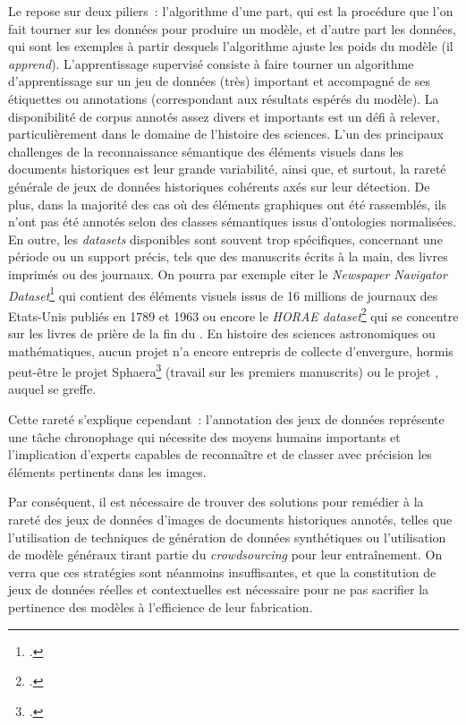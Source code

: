 
Le \ml repose sur deux piliers~: l'algorithme d'une part,
qui est la procédure que l'on fait tourner sur les données pour produire
un modèle, et d'autre part les données, qui sont les exemples à partir
desquels l'algorithme ajuste les poids du modèle (il \emph{apprend}).
L'apprentissage supervisé consiste à faire tourner un algorithme d'apprentissage
sur un jeu de données (très) important et accompagné de ses étiquettes
ou annotations (correspondant aux résultats espérés du modèle). La
disponibilité de corpus annotés assez divers et importants est un défi à
relever, particulièrement dans le domaine de l'histoire des sciences.
L'un des principaux challenges de la reconnaissance sémantique des
éléments visuels dans les documents historiques est leur grande
variabilité, ainsi que, et surtout, la rareté générale de jeux de
données historiques cohérents axés sur leur détection. De plus, dans la majorité des cas où des éléments graphiques
ont été rassemblés, ils n'ont pas été annotés selon des classes
sémantiques issus d'ontologies normalisées. En outre, les
\emph{datasets} disponibles sont souvent trop spécifiques, concernant
une période ou un support précis, tels que des manuscrits écrits à la
main, des livres imprimés ou des journaux. On pourra par exemple citer
le \emph{Newspaper Navigator Dataset}\footcite{lee_newspaper_2020} qui contient des
éléments visuels issus de 16 millions de journaux des Etats-Unis publiés
en 1789 et 1963 ou encore le \emph{HORAE dataset}\footcite{noauthor_horae_nodate} qui se
concentre sur les livres de prière de la fin du \ma. En histoire
des sciences astronomiques ou mathématiques, aucun projet n'a encore
entrepris de collecte d'envergure, hormis peut-être le projet
Sphaera\footcite{noauthor_sphere_nodate} (travail sur les premiers manuscrits) ou le projet \vhs, auquel \eida se greffe.

Cette rareté s'explique cependant~: l'annotation des jeux de données
représente une tâche chronophage qui nécessite des moyens humains
importants et l'implication d'experts capables de reconnaître et de
classer avec précision les éléments pertinents dans les images.

Par conséquent, il est nécessaire de trouver des solutions pour remédier à
la rareté des jeux de données d'images de documents historiques
annotés, telles que l'utilisation de techniques de génération de
données synthétiques ou l'utilisation de modèle généraux tirant partie
du \textit{crowdsourcing} pour leur entraînement. On verra que ces stratégies sont néanmoins
insuffisantes, et que la constitution de jeux de données réelles et
contextuelles est nécessaire pour ne pas sacrifier la pertinence des
modèles à l'efficience de leur fabrication.

